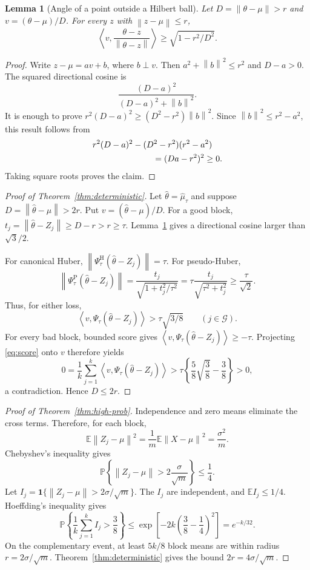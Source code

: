 \documentclass[twoside]{article}
\newtheorem{lemma}[theorem]{Lemma}
\theoremstyle{definition}
\newcommand{\E}{\mathbb E}
\newcommand{\Pp}{\mathbb P}
\newcommand{\norm}[1]{\left\lVert #1\right\rVert}
\newcommand{\ip}[2]{\left\langle #1,#2\right\rangle}
\newcommand{\ind}{\mathbf 1}
\begin{document}
\begin{lemma}[Angle of a point outside a Hilbert ball]\label{lem:angle}
Let $D=\norm{\theta-\mu}>r$ and $v=(\theta-\mu)/D$. For every $z$ with $\norm{z-\mu}\le r$,
\[
    \left\langle v,\frac{\theta-z}{\norm{\theta-z}}\right\rangle
    \ge\sqrt{1-r^2/D^2}.
\]
\end{lemma}

\begin{proof}
Write $z-\mu=av+b$, where $b\perp v$. Then $a^2+\norm b^2\le r^2$ and $D-a>0$. The squared directional cosine is
\[
    \frac{(D-a)^2}{(D-a)^2+\norm b^2}.
\]
It is enough to prove $r^2(D-a)^2\ge(D^2-r^2)\norm b^2$. Since $\norm b^2\le r^2-a^2$, this result follows from
\begin{align*}
&r^2(D-a)^2-(D^2-r^2)(r^2-a^2)\\
&\hspace{25mm}=(Da-r^2)^2\ge0.
\end{align*}
Taking square roots proves the claim.
\end{proof}

\begin{proof}[Proof of Theorem~\ref{thm:deterministic}]
Let $\hat\theta=\hat\mu_\tau$ and suppose $D=\norm{\hat\theta-\mu}>2r$. Put $v=(\hat\theta-\mu)/D$. For a good block, $t_j=\norm{\hat\theta-Z_j}\ge D-r>r\ge\tau$. Lemma~\ref{lem:angle} gives a directional cosine larger than $\sqrt3/2$.

For canonical Huber, $\norm{\Psi^{\mathrm H}_\tau(\hat\theta-Z_j)}=\tau$. For pseudo-Huber,
\[
    \norm{\Psi^{\mathrm P}_\tau(\hat\theta-Z_j)}
    =\frac{t_j}{\sqrt{1+t_j^2/\tau^2}}
    =\tau\frac{t_j}{\sqrt{\tau^2+t_j^2}}
    \ge\frac\tau{\sqrt2}.
\]
Thus, for either loss,
\[
    \ip{v}{\Psi_\tau(\hat\theta-Z_j)}
    >\tau\sqrt{3/8}
    \qquad(j\in\mathcal G).
\]
For every bad block, bounded score gives $\ip{v}{\Psi_\tau(\hat\theta-Z_j)}\ge-\tau$. Projecting \eqref{eq:score} onto $v$ therefore yields
\[
    0=\frac1k\sum_{j=1}^k
    \ip{v}{\Psi_\tau(\hat\theta-Z_j)}
    >\tau\left\{\frac58\sqrt{\frac38}-\frac38\right\}>0,
\]
a contradiction. Hence $D\le2r$.
\end{proof}

\begin{proof}[Proof of Theorem~\ref{thm:high-prob}]
Independence and zero means eliminate the cross terms. Therefore, for each block,
\[
    \E\norm{Z_j-\mu}^2
    =\frac1m\E\norm{X-\mu}^2
    =\frac{\sigma^2}{m}.
\]
Chebyshev's inequality gives
\[
    \Pp\left\{\norm{Z_j-\mu}>2\frac\sigma{\sqrt m}\right\}\le\frac14.
\]
Let $I_j=\ind\{\norm{Z_j-\mu}>2\sigma/\sqrt m\}$. The $I_j$ are independent, and $\E I_j\le1/4$. Hoeffding's inequality gives
\[
    \Pp\left\{\frac1k\sum_{j=1}^k I_j>\frac38\right\}
    \le\exp\left[-2k\left(\frac38-\frac14\right)^2\right]
    =e^{-k/32}.
\]
On the complementary event, at least $5k/8$ block means are within radius $r=2\sigma/\sqrt m$. Theorem~\ref{thm:deterministic} gives the bound $2r=4\sigma/\sqrt m$.
\end{proof}
\end{document}
